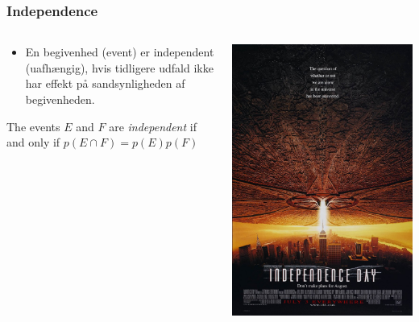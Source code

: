 \documentclass{beamer}
\begin{document}
\begin{frame}
  \frametitle{Independence}
  \begin{columns}
    \begin{column}{.5\textwidth}
      \begin{itemize}
        \item En begivenhed (event) er independent (uafhængig), hvis tidligere udfald ikke har effekt på sandsynligheden af begivenheden.
      \end{itemize}
      \begin{definition}[Definition 4]
        The events \(E\) and \(F\) are \textit{independent} if and only if \(p(E \cap F) = p(E)p(F)\)
      \end{definition}
    \end{column}
    \begin{column}{.5\textwidth}
      \includegraphics[width=\linewidth]{independence-day.png}
    \end{column}
  \end{columns} 
\end{frame}
\end{document}
